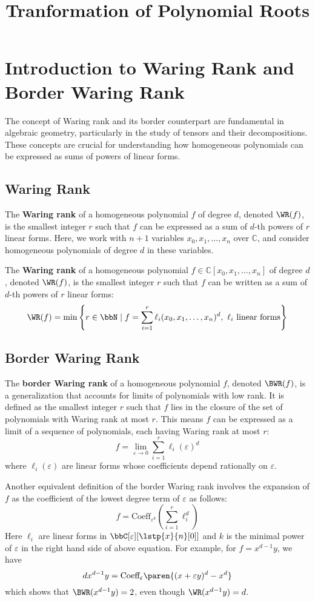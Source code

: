 \documentclass[a4paper,11pt,american]{article}
\title{Tranformation of Polynomial Roots}
\theoremstyle{definition}
\theoremstyle{remark}
\begin{document}
\section{Introduction to Waring Rank and Border Waring Rank}

The concept of Waring rank and its border counterpart are fundamental in algebraic geometry, particularly in the study of tensors and their decompositions.
These concepts are crucial for understanding how homogeneous polynomials can be expressed as sums of powers of linear forms.
\subsection{Waring Rank}
The \textbf{Waring rank} of a homogeneous polynomial $f$ of degree $d$, denoted $\WR(f)$, is the smallest integer $r$ such that $f$ can be expressed as a sum of $d$-th powers of $r$ linear forms. Here, we work with $n+1$ variables $x_0, x_1, \dots, x_n$ over $\mathbb{C}$, and consider homogeneous polynomials of degree $d$ in these variables.

The \textbf{Waring rank} of a homogeneous polynomial $f \in \mathbb{C}[x_0, x_1, \dots, x_n]$ of degree $d$, denoted $\WR(f)$, is the smallest integer $r$ such that $f$ can be written as a sum of $d$-th powers of $r$ linear forms:
\[
\WR(f) = \min \left\{ r \in \bbN \mid f = \sum_{i=1}^{r} \ell_i(x_0, x_1, \dots, x_n)^d,\ \ell_i \text{ linear forms} \right\}
\]

\subsection{Border Waring Rank}
The \textbf{border Waring rank} of a homogeneous polynomial $f$, denoted $\BWR(f)$, is a generalization that accounts for limits of polynomials with low rank. It is defined as the smallest integer $r$ such that $f$ lies in the closure of the set of polynomials with Waring rank at most $r$. This means $f$ can be expressed as a limit of a sequence of polynomials, each having Waring rank at most $r$:
\[
f = \lim_{\varepsilon \to 0} \sum_{i=1}^{r} \ell_i(\varepsilon)^d
\]
where $\ell_i(\varepsilon)$ are linear forms whose coefficients depend rationally on $\varepsilon$.

Another equivalent definition of the border Waring rank involves the expansion of $f$ as the coefficient of the lowest degree term of $\varepsilon$ as follows:
\[
f = \text{Coeff}_{\varepsilon^k} \left( \sum_{i=1}^r \ell_i^d \right)
\]
Here $\ell_i$ are linear forms in $\bbC[\varepsilon][\lstp{x}{n}[0]]$ and  $k$ is the minimal power of $\varepsilon$ in the right hand side of above equation. For example, for $f = x^{d-1}y$, we have
\[
dx^{d-1}y = \text{Coeff}_{\varepsilon} \paren{ (x+\varepsilon y)^d - x^d }
\]
which shows that $\BWR(x^{d-1}y) = 2$, even though $\WR(x^{d-1}y) = d$.
\end{document}
